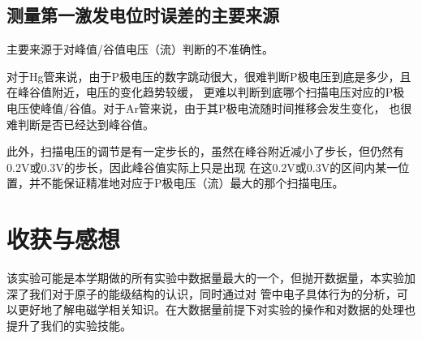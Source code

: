 \documentclass{article}
\begin{document}
    \subsection{测量第一激发电位时误差的主要来源}
    主要来源于对峰值/谷值电压（流）判断的不准确性。
    
    对于Hg管来说，由于P极电压的数字跳动很大，很难判断P极电压到底是多少，且在峰谷值附近，电压的变化趋势较缓，
    更难以判断到底哪个扫描电压对应的P极电压使峰值/谷值。对于Ar管来说，由于其P极电流随时间推移会发生变化，
    也很难判断是否已经达到峰谷值。

    此外，扫描电压的调节是有一定步长的，虽然在峰谷附近减小了步长，但仍然有0.2V或0.3V的步长，因此峰谷值实际上只是出现
    在这0.2V或0.3V的区间内某一位置，并不能保证精准地对应于P极电压（流）最大的那个扫描电压。

    \section{收获与感想}
    该实验可能是本学期做的所有实验中数据量最大的一个，但抛开数据量，本实验加深了我们对于原子的能级结构的认识，同时通过对
    管中电子具体行为的分析，可以更好地了解电磁学相关知识。在大数据量前提下对实验的操作和对数据的处理也提升了我们的实验技能。
\end{document}
